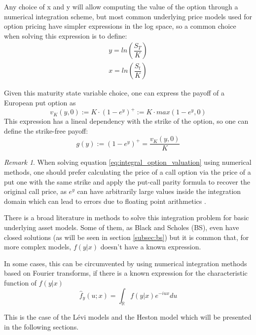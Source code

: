 \documentclass[12,twoside]{mammeTFM}
\theoremstyle{definition}
\theoremstyle{remark}
\newtheorem{remark}[thm]{Remark}
\newcommand{\R}{\ensuremath{\mathbb{R}}}
\begin{document}
Any choice of x and y will allow computing the value of the option through a numerical integration scheme, but most common underlying price models used for option pricing have simpler expressions in the log space, so a common choice when solving this expression is to define:
\begin{align}
\label{eq:y}
y = ln \left(\dfrac{S_T}{K} \right) \\
\label{eq:x}
x = ln \left(\dfrac{S_t}{K} \right)
\end{align}

Given this maturity state variable choice, one can express the payoff of a European put option as
\begin{equation} \label{eq:european_payoff}
v_{K}(y, 0) := K \cdot (1 - e^y)^{+} := K \cdot max(1 - e^y, 0)
\end{equation}
This expression has a lineal dependency with the strike of the option, so one can define the strike-free payoff:
\begin{equation}
g(y) := (1 - e^y)^{+} = \dfrac{v_{K}(y, 0)}{K}
\end{equation}

\begin{remark}
When solving equation \ref{eq:integral_option_valuation} using numerical methods, one should prefer calculating the price of a call option via the price of a put one with the same strike and apply the put-call parity formula to recover the original call price, as $e^y$ can have arbitrarily large values inside the integration domain which can lead to errors due to floating point arithmetics \cite{mar17}.
\end{remark}

There is a broad literature in methods to solve this integration problem for basic underlying asset models. Some of them, as Black and Scholes (BS), even have closed solutions (as will be seen in section \ref{subsec:bs}) but it is common that, for more complex models, $f(y|x)$ doesn't have a known expression.

In some cases, this can be circumvented by using numerical integration methods based on Fourier transforms, if there is a known expression for the characteristic function of $f(y|x)$
\begin{equation}
\hat{f}_y(u;x) = \int_{\R} f(y | x) e^{-iux} du
\end{equation}

This is the case of the L\'evi models and the Heston model which will be presented in the following sections.
\end{document}
